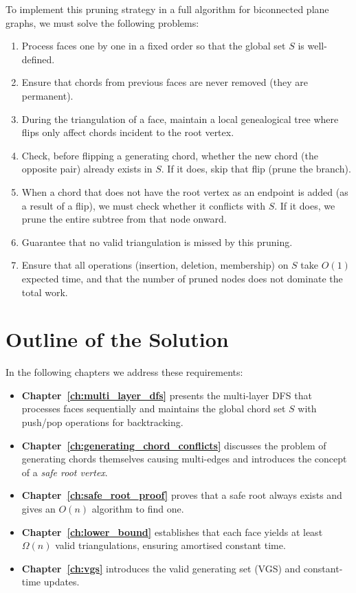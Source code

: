 To implement this pruning strategy in a full algorithm for biconnected plane graphs, we must solve the following problems:

\begin{enumerate}
    \item Process faces one by one in a fixed order so that the global set \(S\) is well-defined.
    \item Ensure that chords from previous faces are never removed (they are permanent). 
    \item During the triangulation of a face, maintain a local genealogical tree where flips only affect chords incident to the root vertex.
    \item Check, before flipping a generating chord, whether the new chord (the opposite pair) already exists in \(S\). 
    If it does, skip that flip (prune the branch).
    \item When a chord that does not have the root vertex as an endpoint is added (as a result of a flip), we must check whether it conflicts with \(S\). 
    If it does, we prune the entire subtree from that node onward.
    \item Guarantee that no valid triangulation is missed by this pruning.
    \item Ensure that all operations (insertion, deletion, membership) on \(S\) take \(O(1)\) expected time, and that the number of pruned nodes does not dominate the total work.
\end{enumerate}

\section{Outline of the Solution}
\label{sec:pruning_outline}

In the following chapters we address these requirements:

\begin{itemize}
    \item \textbf{Chapter~\ref{ch:multi_layer_dfs}} presents the multi-layer DFS that processes faces sequentially and maintains the global chord set \(S\) with push/pop operations for backtracking.
    \item \textbf{Chapter~\ref{ch:generating_chord_conflicts}} discusses the problem of generating chords themselves causing multi-edges and introduces the concept of a \emph{safe root vertex}.
    \item \textbf{Chapter~\ref{ch:safe_root_proof}} proves that a safe root always exists and gives an \(O(n)\) algorithm to find one.
    \item \textbf{Chapter~\ref{ch:lower_bound}} establishes that each face yields at least \(\Omega(n)\) valid triangulations, ensuring amortised constant time.
    \item \textbf{Chapter~\ref{ch:vgs}} introduces the valid generating set (VGS) and constant-time updates.
\end{itemize}


